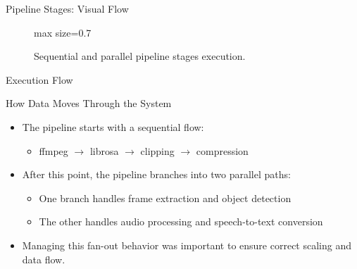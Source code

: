 \documentclass[aspectratio=169,10pt]{beamer}
\begin{document}
\begin{frame}{Pipeline Stages: Visual Flow}
    \vspace{0.3cm}
    \begin{figure}
        \centering
        \begin{adjustbox}{max size={\textwidth}{0.7\textheight}}
        \end{adjustbox}
        \caption{Sequential and parallel pipeline stages execution.}
    \end{figure}
\end{frame}
\begin{frame}{Execution Flow}
    \begin{block}{How Data Moves Through the System}
        \begin{itemize}[<+->]
            \item The pipeline starts with a sequential flow:
            \begin{itemize}[<+->]
                \item ffmpeg $\rightarrow$ librosa $\rightarrow$ clipping $\rightarrow$ compression
            \end{itemize}
            \item After this point, the pipeline branches into two parallel paths:
            \begin{itemize}[<+->]
                \item One branch handles frame extraction and object detection
                \item The other handles audio processing and speech-to-text conversion
            \end{itemize}
            \item Managing this fan-out behavior was important to ensure correct scaling and data flow.
        \end{itemize}
    \end{block}
\end{frame}
\end{document}
